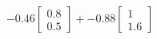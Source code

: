 \documentclass[preview]{standalone}
\begin{document}
\begin{align*}
-0.46 \begin{bmatrix} 0.8 \\ 0.5 \end{bmatrix} + -0.88 \begin{bmatrix} 1 \\ 1.6 \end{bmatrix}
\end{align*}
\end{document}
